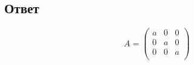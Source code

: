 \documentclass[a4paper]{article}
\begin{document}
\subsection*{Ответ}
\begin{equation*}
A = 
\begin{pmatrix}
a &0&0\\
0&a&0\\
0&0&a\\
\end{pmatrix}
\end{equation*}
\end{document}
